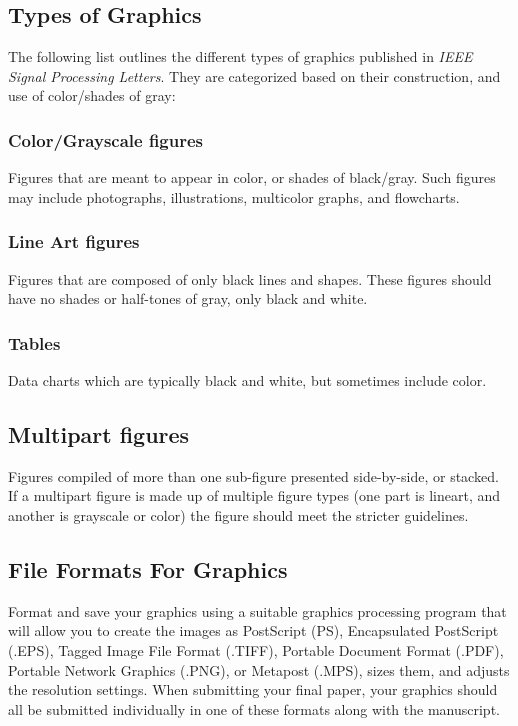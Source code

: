 \documentclass[journal]{IEEEtran}
\begin{document}
\subsection{Types of Graphics}
The following list outlines the different types of graphics published in 
{\it IEEE Signal Processing Letters}. They are categorized based on their construction, and use of 
color/shades of gray:

\subsubsection{Color/Grayscale figures}
{Figures that are meant to appear in color, or shades of black/gray. Such 
figures may include photographs, illustrations, multicolor graphs, and 
flowcharts.}

\subsubsection{Line Art figures}
{Figures that are composed of only black lines and shapes. These figures 
should have no shades or half-tones of gray, only black and white.}

\subsubsection{Tables}
{Data charts which are typically black and white, but sometimes include 
color.}



\subsection{Multipart figures}
Figures compiled of more than one sub-figure presented side-by-side, or 
stacked. If a multipart figure is made up of multiple figure
types (one part is lineart, and another is grayscale or color) the figure 
should meet the stricter guidelines.

\subsection{File Formats For Graphics}\label{formats}
Format and save your graphics using a suitable graphics processing program 
that will allow you to create the images as PostScript (PS), Encapsulated 
PostScript (.EPS), Tagged Image File Format (.TIFF), Portable Document 
Format (.PDF), Portable Network Graphics (.PNG), or Metapost (.MPS), sizes them, and adjusts 
the resolution settings. When 
submitting your final paper, your graphics should all be submitted 
individually in one of these formats along with the manuscript.
\end{document}
